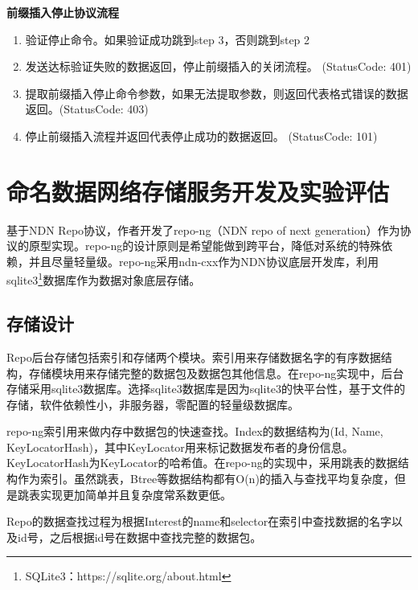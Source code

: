 \textbf{前缀插入停止协议流程}

\begin{enumerate}[step 1.]
\item 验证停止命令。如果验证成功跳到step 3，否则跳到step 2
\item 发送达标验证失败的数据返回，停止前缀插入的关闭流程。 (StatusCode: 401)
\item 提取前缀插入停止命令参数，如果无法提取参数，则返回代表格式错误的数据返回。(StatusCode: 403)
\item 停止前缀插入流程并返回代表停止成功的数据返回。 (StatusCode: 101)
\end{enumerate}


\section{命名数据网络存储服务开发及实验评估}
基于NDN Repo协议，作者开发了repo-ng（NDN repo of next generation）作为协议的原型实现。repo-ng的设计原则是希望能做到跨平台，降低对系统的特殊依赖，并且尽量轻量级。repo-ng采用ndn-cxx作为NDN协议底层开发库，利用sqlite3\footnote{SQLite3：https://sqlite.org/about.html}数据库作为数据对象底层存储。

\subsection{存储设计}
Repo后台存储包括索引和存储两个模块。索引用来存储数据名字的有序数据结构，存储模块用来存储完整的数据包及数据包其他信息。在repo-ng实现中，后台存储采用sqlite3数据库。选择sqlite3数据库是因为sqlite3的快平台性，基于文件的存储，软件依赖性小，非服务器，零配置的轻量级数据库。

repo-ng索引用来做内存中数据包的快速查找。Index的数据结构为(Id, Name, KeyLocatorHash)，其中KeyLocator用来标记数据发布者的身份信息。KeyLocatorHash为KeyLocator的哈希值。在repo-ng的实现中，采用跳表的数据结构作为索引。虽然跳表，Btree等数据结构都有O(n)的插入与查找平均复杂度，但是跳表实现更加简单并且复杂度常系数更低。\cite{pugh1990skip}

Repo的数据查找过程为根据Interest的name和selector在索引中查找数据的名字以及id号，之后根据id号在数据中查找完整的数据包。

